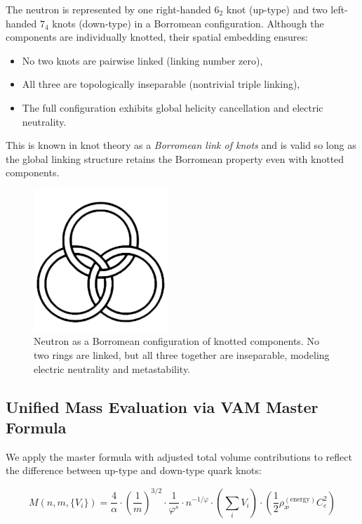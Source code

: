 The neutron is represented by one right-handed \( 6_2 \) knot (up-type) and two left-handed \( 7_4 \) knots (down-type) in a Borromean configuration. Although the components are individually knotted, their spatial embedding ensures:

\begin{itemize}
    \item No two knots are pairwise linked (linking number zero),
    \item All three are topologically inseparable (nontrivial triple linking),
    \item The full configuration exhibits global helicity cancellation and electric neutrality.
\end{itemize}

This is known in knot theory as a \emph{Borromean link of knots} and is valid so long as the global linking structure retains the Borromean property even with knotted components.

\begin{figure}[H]
    \centering
    \includegraphics[width=0.45\textwidth]{images/borromean}
    \caption{Neutron as a Borromean configuration of knotted components. No two rings are linked, but all three together are inseparable, modeling electric neutrality and metastability.}
\end{figure}

\subsection{Unified Mass Evaluation via VAM Master Formula}

We apply the master formula with adjusted total volume contributions to reflect the difference between up-type and down-type quark knots:

\begin{equation}
\boxed{
M(n, m, \{V_i\}) = \frac{4}{\alpha} \cdot \left( \frac{1}{m} \right)^{3/2}
\cdot \frac{1}{\varphi^s} \cdot n^{-1/\varphi}
\cdot \left( \sum_i V_i \right)
\cdot \left( \frac{1}{2} \rho_\text{\ae}^{(\text{energy})} C_e^2 \right)
}
\end{equation}

